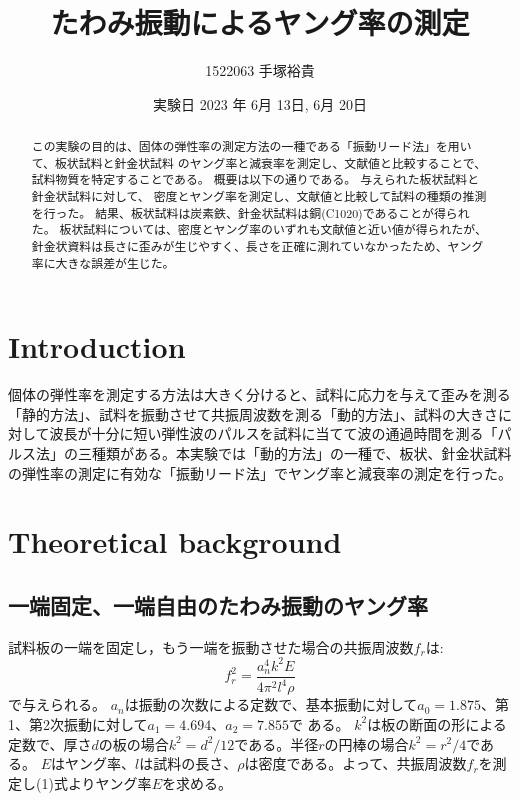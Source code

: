\documentclass[a4paper,11pt]{jsarticle}
\begin{document}
\title{たわみ振動によるヤング率の測定}
\author{1522063 手塚裕貴}
\date{実験日 2023 年 6月 13日, 6月 20日}
\maketitle

\begin{abstract}
この実験の目的は、固体の弾性率の測定方法の一種である「振動リード法」を用いて、板状試料と針金状試料
のヤング率と減衰率を測定し、文献値と比較することで、試料物質を特定することである。
概要は以下の通りである。
与えられた板状試料と針金状試料に対して、
密度とヤング率を測定し、文献値と比較して試料の種類の推測を行った。
結果、板状試料は炭素鉄、針金状試料は銅(C1020)であることが得られた。
板状試料については、密度とヤング率のいずれも文献値と近い値が得られたが、針金状資料は長さに歪みが生じやすく、長さを正確に測れていなかったため、ヤング率に大きな誤差が生じた。

\end{abstract}


\section{Introduction}
個体の弾性率を測定する方法は大きく分けると、試料に応力を与えて歪みを測る「静的方法」、試料を振動させて共振周波数を測る「動的方法」、試料の大きさに対して波長が十分に短い弾性波のパルスを試料に当てて波の通過時間を測る「パルス法」の三種類がある。本実験では「動的方法」の一種で、板状、針金状試料の弾性率の測定に有効な「振動リード法」でヤング率と減衰率の測定を行った。
\section{Theoretical background}
\subsection{一端固定、一端自由のたわみ振動のヤング率}
試料板の一端を固定し，もう一端を振動させた場合の共振周波数$f_r$は:
\begin{equation}
  f_r^2 = \frac{a_n^4 k^2 E}{4 \pi^2 l^4 \rho}
\end{equation}
で与えられる。
$a_n$は振動の次数による定数で、基本振動に対して$a_0 = 1.875$、第1、第2次振動に対して$a_1=4.694$、$a_2=7.855$で
ある。
$k^2$は板の断面の形による定数で、厚さ$d$の板の場合$k^2 = d^2/12$である。半径$r$の円棒の場合$k^2 = r^2/4$である。 $E$はヤング率、$l$は試料の長さ、$\rho$は密度である。よって、共振周波数$f_r$を測定し(1)式よりヤング率$E$を求める。
\end{document}
